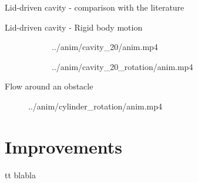 \documentclass{beamer}  %
\begin{document}
\begin{frame}{Lid-driven cavity - comparison with the literature}
    \begin{figure}
        \centering
        
    \end{figure}
\end{frame}

\begin{frame}{Lid-driven cavity - Rigid body motion}
    \begin{figure}
        \centering
        \begin{subfigure}[t]{0.4\textwidth}
            \movie[width=\textwidth, height=\textwidth, showcontrols]{} {../anim/cavity_20/anim.mp4}
        \end{subfigure}
        \begin{subfigure}[t]{0.4\textwidth}
            \movie[width=\textwidth, height=\textwidth, showcontrols]{} {../anim/cavity_20_rotation/anim.mp4}
        \end{subfigure}
    \end{figure}
\end{frame}

\begin{frame}{Flow around an obstacle}
    \begin{figure}
        \centering
        \movie[width=0.75\textheight, height=0.75\textheight, showcontrols]{} {../anim/cylinder_rotation/anim.mp4}
    \end{figure}
\end{frame}


\section{Improvements}
\begin{frame}{tt}
    blabla
\end{frame}

\end{document}
